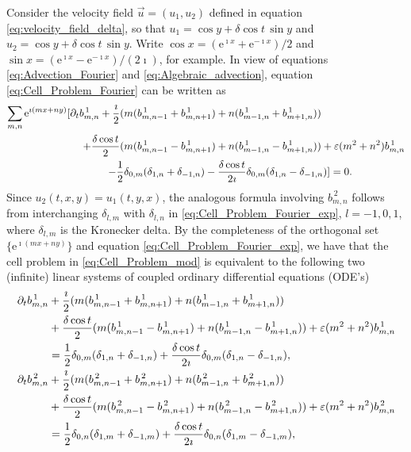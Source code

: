 \documentclass[11pt]{amsart}
\newcommand{\e}{\mathrm{e}}
\begin{document}
Consider the velocity field $\vec{u}=(u_1,u_2)$ defined in equation
\eqref{eq:velocity_field_delta}, so that $u_1=\cos{y}+\delta\cos{t}\,\sin{y}$ and
$u_2=\cos{y}+\delta\cos{t}\,\sin{y}$. Write $\cos{x}=(\e^{\imath x}+\e^{-\imath x})/2$
and $\sin{x}=(\e^{\imath x}-\e^{-\imath x})/(2\imath)$, for example. In view of
equations \eqref{eq:Advection_Fourier}
and \eqref{eq:Algebraic_advection}, equation 
\eqref{eq:Cell_Problem_Fourier} can be written as
%
\begin{align}\label{eq:Cell_Problem_Fourier_exp}
  \sum_{m,n}\e^{\imath (mx+ny)}[
    \partial_tb^{\,1}_{m,n}
    +\frac{\imath}{2}(&m(b^{\,1}_{m,n-1}+b^{\,1}_{m,n+1})+n(b^{\,1}_{m-1,n}+b^{\,1}_{m+1,n}))
    \\
    +\frac{\delta\cos{t}}{2}(&m(b^{\,1}_{m,n-1}-b^{\,1}_{m,n+1})+n(b^{\,1}_{m-1,n}-b^{\,1}_{m+1,n}))
    +\varepsilon(m^2+n^2)b^{\,1}_{m,n}
    \notag\\
    -\frac{1}{2}&\delta_{0,m}(\delta_{1,n}+\delta_{-1,n})
          -\frac{\delta\cos{t}}{2\imath}\delta_{0,m}(\delta_{1,n}-\delta_{-1,n})]=0.
    \notag
\end{align}
%
Since $u_2(t,x,y)=u_1(t,y,x)$, the analogous formula involving
$b^{\,2}_{m,n}$ follows from interchanging $\delta_{l,m}$ with $\delta_{l,n}$ in
\eqref{eq:Cell_Problem_Fourier_exp}, $l=-1,0,1$, where $\delta_{l,m}$ is
the Kronecker delta. By the completeness of the orthogonal set
$\{\e^{\imath(mx+ny)}\}$ and equation \eqref{eq:Cell_Problem_Fourier_exp}, we
have that the cell problem in \eqref{eq:Cell_Problem_mod} is
equivalent to the following two (infinite) linear systems of coupled
ordinary differential equations (ODE's)    
%
\begin{align}\label{eq:Cell_Problem_ODE}
  \partial_tb^{\,1}_{m,n}
    &+\frac{\imath}{2}(m(b^{\,1}_{m,n-1}+b^{\,1}_{m,n+1})+n(b^{\,1}_{m-1,n}+b^{\,1}_{m+1,n}))
    \\
    &+\frac{\delta\cos{t}}{2}(m(b^{\,1}_{m,n-1}-b^{\,1}_{m,n+1})+n(b^{\,1}_{m-1,n}-b^{\,1}_{m+1,n}))
    +\varepsilon(m^2+n^2)b^{\,1}_{m,n}
    \notag\\
    &=\frac{1}{2}\delta_{0,m}(\delta_{1,n}+\delta_{-1,n})
          +\frac{\delta\cos{t}}{2\imath}\delta_{0,m}(\delta_{1,n}-\delta_{-1,n}),
    \notag\\
 \partial_tb^{\,2}_{m,n}
    &+\frac{\imath}{2}(m(b^{\,2}_{m,n-1}+b^{\,2}_{m,n+1})+n(b^{\,2}_{m-1,n}+b^{\,2}_{m+1,n}))
    \notag\\
    &+\frac{\delta\cos{t}}{2}(m(b^{\,2}_{m,n-1}-b^{\,2}_{m,n+1})+n(b^{\,2}_{m-1,n}-b^{\,2}_{m+1,n}))
    +\varepsilon(m^2+n^2)b^{\,2}_{m,n}
    \notag\\
    &=\frac{1}{2}\delta_{0,n}(\delta_{1,m}+\delta_{-1,m})
          +\frac{\delta\cos{t}}{2\imath}\delta_{0,n}(\delta_{1,m}-\delta_{-1,m}),
    \notag          
\end{align}
\end{document}

